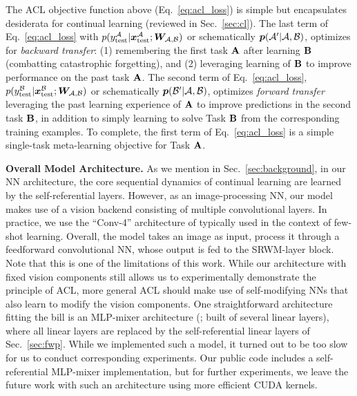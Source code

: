 \documentclass{article}
\begin{document}
The ACL objective function above (Eq.~\ref{eq:acl_loss}) is simple but  encapsulates desiderata for continual learning (reviewed in Sec.~\ref{sec:cl}).
The last term of Eq.~\ref{eq:acl_loss} with $p(y^{\mathcal{A}}_\text{test}|{\bm{x}}^{\mathcal{A}}_\text{test}; {\bm{W}}_{\mathcal{A, B}})$
or schematically ${\bm{p}}(\mathcal{A}'|\mathcal{A}, \mathcal{B})$, optimizes for \textit{backward transfer}: (1) remembering the first task ${\mathbf{A}}$ after learning ${\mathbf{B}}$ (combatting catastrophic forgetting), and
(2) leveraging learning of ${\mathbf{B}}$ to improve performance on the past task ${\mathbf{A}}$.
The second term of Eq.~\ref{eq:acl_loss}, $p(y^{\mathcal{B}}_\text{test}|{\bm{x}}^{\mathcal{B}}_\text{test}; {\bm{W}}_{\mathcal{A, B}})$
or schematically ${\bm{p}}(\mathcal{B}'|\mathcal{A}, \mathcal{B})$, optimizes \textit{forward transfer} leveraging the past learning experience of ${\mathbf{A}}$ to improve predictions in the second task ${\mathbf{B}}$, in addition to simply learning to solve Task ${\mathbf{B}}$ from the corresponding training examples.
To complete, the first term of Eq.~\ref{eq:acl_loss} is a simple single-task meta-learning objective for Task ${\mathbf{A}}$.


\textbf{Overall Model Architecture.} As we mention in Sec.~\ref{sec:background}, in our NN architecture,
the core sequential dynamics of continual learning are learned by the self-referential layers.
However, as an image-processing NN, our model makes use of a vision backend consisting of multiple convolutional layers.
In practice, we use the ``Conv-4'' architecture of \citet{VinyalsBLKW16} typically used in the context of few-shot learning.
Overall, the model takes an image as input, process it through a feedforward convolutional NN, whose output is fed to the SRWM-layer block.
Note that this is one of the limitations of this work.
While our architecture with fixed vision components still allows us to experimentally demonstrate the principle of ACL, more general ACL should make use of self-modifying NNs that also learn to modify the vision components.
One straightforward architecture fitting the bill is an MLP-mixer architecture (\citet{TolstikhinHKBZU21}; built of several linear layers),
where all linear layers are replaced by the self-referential linear layers of Sec.~\ref{sec:fwp}.
While we implemented such a model, it turned out to be too slow for us to conduct corresponding experiments.
Our public code includes a self-referential MLP-mixer implementation, but for further experiments, we leave the future work with such an architecture using more efficient CUDA kernels.
\end{document}
